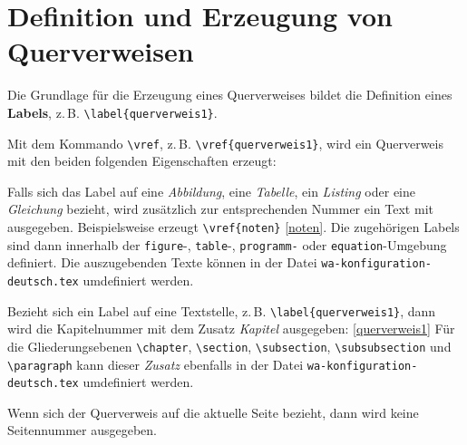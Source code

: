 %
%
\section{Definition und Erzeugung von Querverweisen}

Die Grundlage f\"ur die Erzeugung eines Querverweises bildet die Definition eines 
\textbf{Labels}, z.\,B. \verb+\label{querverweis1}+\label{querverweis1}.

Mit dem Kommando \verb+\vref+, z.\,B. \verb+\vref{querverweis1}+, wird ein Querverweis mit 
den beiden folgenden Eigenschaften erzeugt:

\begin{seList}
\item 
Falls sich das Label auf eine \textsl{Abbildung}, eine \textsl{Tabelle}, ein \textsl{Listing} oder eine 
\textsl{Gleichung} bezieht, wird zus\"atzlich zur entsprechenden Nummer ein Text mit ausgegeben.
Beispielsweise erzeugt \verb+\vref{noten}+ \vref{noten}. Die zugeh\"origen Labels sind dann innerhalb 
der \verb+figure+-, \verb+table+-, \verb+programm-+ oder \verb+equation+-Umgebung definiert. 
Die auszugebenden Texte k\"onnen in der Datei\newline
\hspace*{\fill}\verb+wa-konfiguration-deutsch.tex+\hspace*{\fill}\newline  
umdefiniert werden.

Bezieht sich ein Label auf eine Textstelle, z.\,B. \verb+\label{querverweis1}+, dann wird die Kapitelnummer 
mit dem Zusatz \textsl{Kapitel} ausgegeben: \vref{querverweis1}\newline
F\"ur die Gliederungsebenen \verb+\chapter+, \verb+\section+, \verb+\subsection+, \verb+\subsubsection+ 
und \verb+\paragraph+ kann dieser \textsl{Zusatz} ebenfalls in der Datei \newline
\hspace*{\fill}\verb+wa-konfiguration-deutsch.tex+\hspace*{\fill}\newline 
umdefiniert werden. 
\item
Wenn sich der Querverweis auf die aktuelle Seite bezieht, dann wird keine Seitennummer ausgegeben.
\end{seList}

